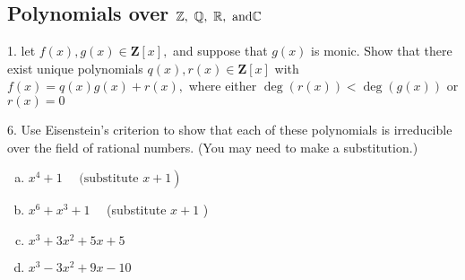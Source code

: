 \subsection{Polynomials over $\mathbb{Z},\ \mathbb{Q},\ \mathbb{R},\ \text{and} \mathbb{C}$}
\begin{mdframed}[style=darkQuesion]
  1. let $f(x), g(x) \in \mathbf{Z}[x],$ and suppose that $g(x)$ is monic. Show that there exist unique polynomials $q(x), r(x) \in \mathbf{Z}[x]$ with $f(x)=q(x) g(x)+r(x),$ where either $\operatorname{deg}(r(x))<\operatorname{deg}(g(x))$ or $r(x)=0$
\end{mdframed}
\begin{mdframed}[style=darkAnswer,frametitle={Joe Starr}]
\end{mdframed}
\newpage
\begin{mdframed}[style=darkQuesion]
  6. Use Eisenstein's criterion to show that each of these polynomials is irreducible over the field of rational numbers. (You may need to make a substitution.)
  \begin{enumerate}[(a)]
\item{$\left.x^{4}+1 \quad \text { (substitute } x+1\right)$}
\item{$x^{6}+x^{3}+1 \quad$ (substitute $x+1$ )}
\item{$ x^{3}+3 x^{2}+5 x+5$}
\item{$x^{3}-3 x^{2}+9 x-10$}
\end{enumerate} 
\end{mdframed}
\begin{mdframed}[style=darkAnswer,frametitle={Joe Starr}]
\end{mdframed}
\newpage
